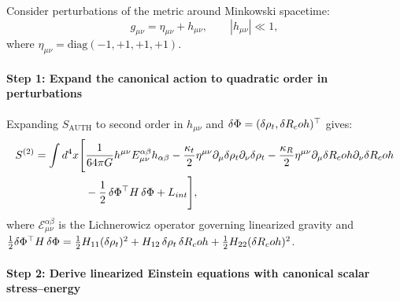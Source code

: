 Consider perturbations of the metric around Minkowski spacetime:
\[
g_{\mu\nu} = \eta_{\mu\nu} + h_{\mu\nu}, \qquad |h_{\mu\nu}| \ll 1,
\]
where $\eta_{\mu\nu} = \mathrm{diag}(-1, +1, +1, +1)$.

\paragraph{Step 1: Expand the canonical action to quadratic order in perturbations}

Expanding $S_{\mathrm{AUTH}}$ to second order in $h_{\mu\nu}$ and $\delta\Phi = (\delta\rho_t, \delta R_coh)^\top$ gives:
\begin{equation}
\label{eq:expanded_action}
\begin{split}
S^{(2)} = \int d^4x \Biggl[ &
    \frac{1}{64 \pi G} h^{\mu\nu} E_{\mu\nu}^{\alpha\beta} h_{\alpha\beta}
    - \frac{\kappa_t}{2} \eta^{\mu\nu} \partial_\mu \delta \rho_t \partial_\nu \delta \rho_t
    - \frac{\kappa_R}{2} \eta^{\mu\nu} \partial_\mu \delta R_coh \partial_\nu \delta R_coh \\
&   - \frac{1}{2}\,\delta\Phi^\top H\,\delta\Phi
    + L_{int} \Biggr],
\end{split}
\end{equation}
where $\mathcal{E}_{\mu\nu}^{\alpha\beta}$ is the Lichnerowicz operator governing linearized gravity and $\frac{1}{2}\delta\Phi^\top H\,\delta\Phi = \frac{1}{2}H_{11}(\delta\rho_t)^2 + H_{12}\,\delta\rho_t\,\delta R_coh + \frac{1}{2}H_{22}(\delta R_coh)^2$.

\paragraph{Step 2: Derive linearized Einstein equations with canonical scalar stress--energy}

